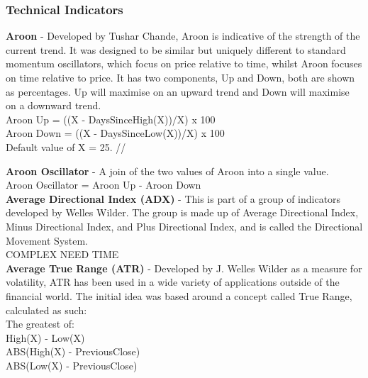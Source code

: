 \documentclass[12pt,a4paper]{article}
\begin{document}
\iffalse
[]
\fi

\iffalse
#################################################################################
\fi

\subsubsection*{Technical Indicators}

\textbf{Aroon} - Developed by Tushar Chande, Aroon is indicative of the strength of the current trend. It was designed to be similar but uniquely different to standard momentum oscillators, which focus on price relative to time, whilst Aroon focuses on time relative to price. It has two components, Up and Down, both are shown as percentages. Up will maximise on an upward trend and Down will maximise on a downward trend.\\

Aroon Up = ((X - DaysSinceHigh(X))/X) x 100\\
Aroon Down = ((X - DaysSinceLow(X))/X) x 100\\
Default value of X = 25. //

\iffalse
[]
\fi

\textbf{Aroon Oscillator} - A join of the two values of Aroon into a single value.\\

Aroon Oscillator = Aroon Up - Aroon Down\\

\iffalse
[]
\fi

\textbf{Average Directional Index (ADX)} - This is part of a group of indicators developed by Welles Wilder. The group is made up of Average Directional Index, Minus Directional Index, and Plus Directional Index, and is called the Directional Movement System. \\

COMPLEX NEED TIME \\

\iffalse
[]
\fi

\textbf{Average True Range (ATR)} - Developed by J. Welles Wilder as a measure for volatility, ATR has been used in a wide variety of applications outside of the financial world. The initial idea was based around a concept called True Range, calculated as such:\\

The greatest of:\\
High(X) - Low(X)\\
ABS(High(X) - PreviousClose)\\
ABS(Low(X) - PreviousClose)\\
\end{document}
